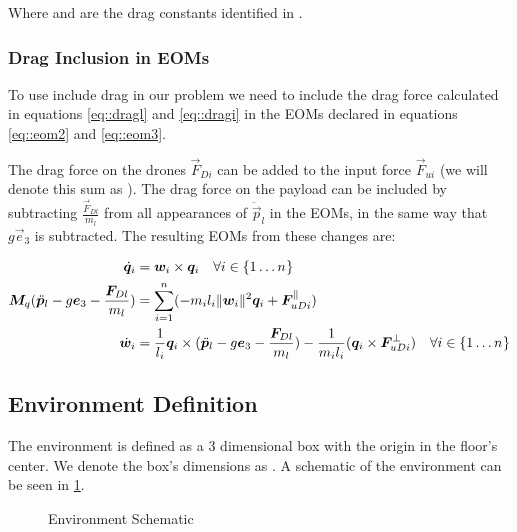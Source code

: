 Where  and  are the drag constants identified in \cite{Potdar2018}.

\subsubsection{Drag Inclusion in \ac{EOMs}}
To use include drag in our problem we need to include the drag force calculated in equations \ref{eq::dragl} and \ref{eq::dragi} in the \ac{EOMs} declared in equations \ref{eq::eom2} and \ref{eq::eom3}.

The drag force on the drones $\vec F_{Di}$ can be added to the input force $\vec F_{ui}$ (we will denote this sum as ). The drag force on the payload can be included by subtracting $\frac{\vec F_{Dl}}{m_l}$ from all appearances of $\ddot{\vec p}_l$ in the \ac{EOMs}, in the same way that $g\vec e_3$ is subtracted. The resulting \ac{EOMs} from these changes are:


\begin{align}
\dot{\bm{q}}_i& = \bm{w}_i \times \bm{q}_i \quad \forall i \in \{1\dots n_{}\} \label{eq::eom_drag1}
\\
\bm{M}_q(\ddot{\bm{p}}_l-g \bm{e}_3-\frac{\bm{F}_{Dl}}{m_l}) &= \sum_{i=1}^{n}(-m_il_i\|\bm{w}_i\|^2\bm{q}_i +\bm{F}_{uDi}^\parallel) \label{eq::eom_drag2}
\\
\dot{\bm{w}}_i &=\frac{1}{l_i}\bm{q}_i\times(\ddot{\bm{p}}_l-g \bm{e}_3-\frac{\bm{F}_{Dl}}{m_l})-\frac{1}{m_il_i}(\bm{q}_i\times\bm{F}_{uDi}^\perp) \quad \forall i \in \{1\dots n_{}\} \label{eq::eom_drag3}
\end{align}

\subsection{Environment Definition}
The environment is defined as a 3 dimensional box with the origin in the floor's center. We denote the box's dimensions as . A schematic of the environment can be seen in \cref{fig::environment}.

\begin{figure}
	\centering
	\caption{Environment Schematic}
	\label{fig::environment}
\end{figure}


